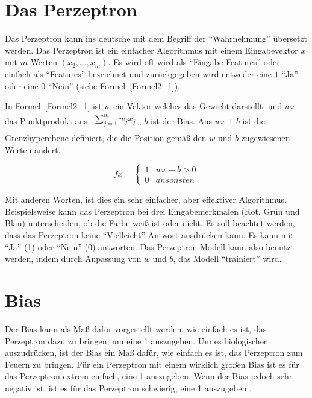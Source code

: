 \section{Das Perzeptron}
Das Perzeptron kann ins deutsche mit dem Begriff der \enquote{Wahrnehmung} übersetzt werden. Das Perzeptron ist ein einfacher Algorithmus mit einem Eingabevektor $x$ mit $m$ Werten $(x_2, ..., x_m)$. Es wird oft wird als \enquote{Eingabe-Features} oder einfach als \enquote{Features} bezeichnet und zurückgegeben wird entweder eine $1$ \enquote{Ja} oder eine $0$ \enquote{Nein} (siehe Formel~\ref{Formel2_1}).

In Formel~\ref{Formel2_1}  ist $w$ ein Vektor welches das Gewicht darstellt, und $wx$ das Punktprodukt aus $\begin{array}{l}
    {\textstyle \sum ^{m}_{j=1}} w_{j} x_{j} \\
  \end{array}$, $b$ ist der Bias.
Aus $wx + b$ ist die Grenzhyperebene definiert, die die Position gemäß den $w$ und $b$ zugewiesenen Werten ändert.

\begin{equation}
  fx=\begin{cases}
    1 & wx+b >0   \\
    0 & ansonsten
  \end{cases}
  \label{Formel2_1}
\end{equation}

Mit anderen Worten, ist dies ein sehr einfacher, aber effektiver Algorithmus. Beispielsweise kann das Perzeptron bei drei Eingabemerkmalen  (Rot, Grün und Blau) unterscheiden, ob die Farbe weiß ist oder nicht. Es soll beachtet werden, dass das Perzeptron keine \enquote{Vielleicht}-Antwort ausdrücken kann. Es kann mit \enquote{Ja} (1) oder \enquote{Nein} (0) antworten. Das Perzeptron-Modell kann also benutzt werden, indem durch Anpassung von $w$ und $b$, das Modell \enquote{trainiert} wird.

\section{Bias}
Der Bias kann als Maß dafür vorgestellt werden, wie einfach es ist, das Perzeptron dazu zu bringen, um eine 1 auszugeben. Um es biologischer auszudrücken, ist der Bias ein Maß dafür, wie einfach es ist, das Perzeptron zum Feuern zu bringen. Für ein Perzeptron mit einem wirklich großen Bias ist es für das Perzeptron extrem einfach, eine 1 auszugeben. Wenn der Bias jedoch sehr negativ ist, ist es für das Perzeptron schwierig, eine 1 auszugeben \cite*[7]{Nielsen2015}.

